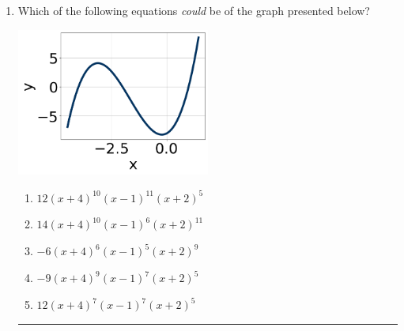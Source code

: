\documentclass[14pt]{extbook}
\newcommand{\litem}[1]{\item#1\hspace*{-1cm}\rule{\textwidth}{0.4pt}}
\begin{document}
\begin{enumerate}
{\begin{enumerate}[label=\Alph*.]
\end{enumerate} }
\litem{
Which of the following equations \textit{could} be of the graph presented below?
\begin{center}
    \includegraphics[width=0.5\textwidth]{../Figures/polyGraphToFunctionCopyA.png}
\end{center}
\begin{enumerate}[label=\Alph*.]
\item \( 12(x + 4)^{10} (x - 1)^{11} (x + 2)^{5} \)
\item \( 14(x + 4)^{10} (x - 1)^{6} (x + 2)^{11} \)
\item \( -6(x + 4)^{6} (x - 1)^{5} (x + 2)^{9} \)
\item \( -9(x + 4)^{9} (x - 1)^{7} (x + 2)^{5} \)
\item \( 12(x + 4)^{7} (x - 1)^{7} (x + 2)^{5} \)


\end{enumerate}}
\end{enumerate}
\end{document}
